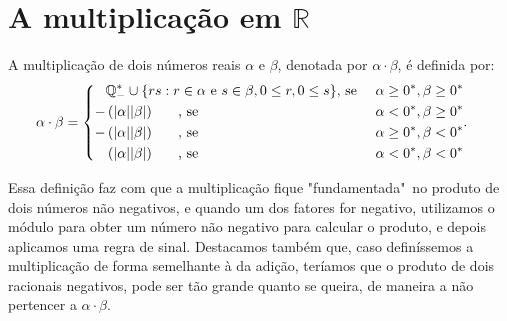 \documentclass[../main.tex]{subfiles}
\begin{document}
\section{A multiplicação em $\mathbb{R}$}
\begin{defi}\label{reais-def-produto}
    A multiplicação de dois números reais $\alpha$ e $\beta$, denotada por $\alpha \cdot \beta$, é definida por:
    \begin{equation*}
         \alpha \cdot \beta = 
        \begin{cases}
        \begin{aligned}
            & \mathbb{Q}^*_{-} \cup \{ rs : r \in \alpha \text{ e } s \in \beta, 0 \leq r, 0 \leq s \} \text{, se } & \alpha \geq 0^*, \beta \geq 0^*  \\
            - & \left(\abs{\alpha}\abs{\beta}\right) \hspace{0.6cm} \text{, se } & \alpha < 0^*, \beta \geq 0^* \\
            - & \left(\abs{\alpha}\abs{\beta}\right) \hspace{0.6cm} \text{, se } & \alpha \geq 0^*, \beta < 0^* \\
              & \left(\abs{\alpha}\abs{\beta}\right) \hspace{0.6cm} \text{, se } & \alpha < 0^*, \beta < 0^*
        \end{aligned}.
        \end{cases}
    \end{equation*}
\end{defi}
Essa definição faz com que a multiplicação fique "fundamentada"\ no produto de dois números não negativos, e quando um dos fatores for negativo, utilizamos o módulo para obter um número não negativo para calcular o produto, e depois aplicamos uma regra de sinal. Destacamos também que, caso definíssemos a multiplicação de forma semelhante à da adição, teríamos que o produto de dois racionais negativos, pode ser tão grande quanto se queira, de maneira a não pertencer a $\alpha \cdot \beta$.
\end{document}
